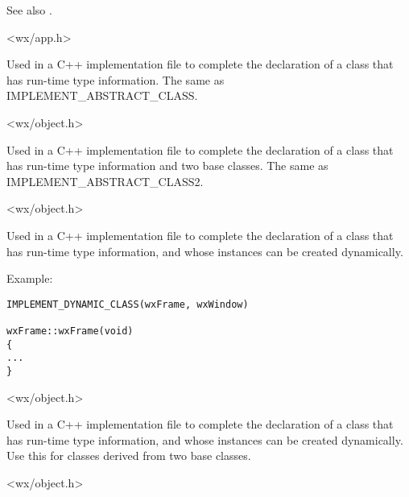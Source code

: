 See also .


<wx/app.h>



Used in a C++ implementation file to complete the declaration of
a class that has run-time type information. The same as IMPLEMENT\_ABSTRACT\_CLASS.


<wx/object.h>



Used in a C++ implementation file to complete the declaration of a
class that has run-time type information and two base classes. The
same as IMPLEMENT\_ABSTRACT\_CLASS2.


<wx/object.h>



Used in a C++ implementation file to complete the declaration of
a class that has run-time type information, and whose instances
can be created dynamically.

Example:

\begin{verbatim}
IMPLEMENT_DYNAMIC_CLASS(wxFrame, wxWindow)

wxFrame::wxFrame(void)
{
...
}
\end{verbatim}


<wx/object.h>



Used in a C++ implementation file to complete the declaration of
a class that has run-time type information, and whose instances
can be created dynamically. Use this for classes derived from two
base classes.


<wx/object.h>

